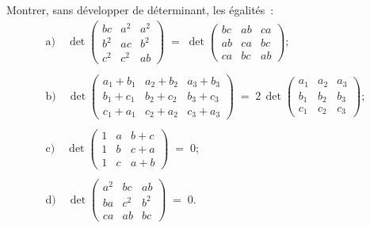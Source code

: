 \documentclass[12pt,french,oneside,a4paper]{memoir} %
\begin{document}
\begin{exo}
Montrer, sans développer de déterminant, les égalités~:
\begin{equation*}
\begin{array}{l}
\mbox{a)} \quad \det \left( \begin{array}{ccc}
bc &a^2 &a^2 \\
b^2 &ac &b^2 \\
c^2 &c^2 &ab
\end{array} \right) \;=\; \det 
\left( \begin{array}{ccc}
bc &ab &ca \\
ab &ca &bc \\
ca &bc &ab
\end{array} \right); \\
\\
\mbox{b)} \quad \det \left( \begin{array}{cccc}
a_1+b_1 &a_2+b_2 &a_3+b_3 \\
b_1+c_1 &b_2+c_2 &b_3+c_3 \\
c_1+a_1 &c_2+a_2 &c_3+a_3
\end{array} \right) \;=\; 2 \, \det \left( \begin{array}{ccc}
a_1 &a_2 &a_3  \\
b_1 &b_2 &b_3 \\
c_1 &c_2 &c_3
\end{array} \right); \\
\\
\mbox{c)} \quad \det \left( \begin{array}{ccc}
1 &a &b+c \\
1 &b &c+a \\
1 &c &a+b
\end{array} \right) \;=\; 0; \\
\\
\mbox{d)} \quad \det \left( \begin{array}{ccc}
a^2 &bc &ab \\
ba &c^2 &b^2 \\
ca &ab &bc
\end{array} \right) \;=\; 0.
\end{array}
\end{equation*}
\end{exo}
\end{document}
